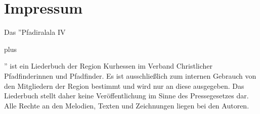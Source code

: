 \section*{Impressum}

\vspace{10pt} Das ''Pfadiralala IV\begin{tiny}plus\end{tiny}'' ist ein Liederbuch der Region Kurhessen im Verband Christlicher Pfadfinderinnen und Pfadfinder. Es ist ausschließlich zum internen Gebrauch von den Mitgliedern der Region bestimmt und wird nur an diese ausgegeben. Das Liederbuch stellt daher keine Veröffentlichung im Sinne des Pressegesetzes dar. Alle Rechte an den Melodien, Texten und Zeichnungen liegen bei den Autoren. \\ \vspace{10pt} 

